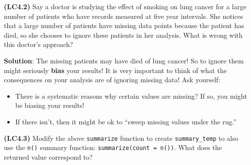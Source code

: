 \documentclass[12pt, krantz2,]{krantz}
\makeatletter
\newenvironment{Shaded}{\begin{snugshade}}{\end{snugshade}}
\newcommand{\CommentTok}[1]{\textcolor[rgb]{0.37,0.37,0.37}{\textit{#1}}}
\newcommand{\KeywordTok}[1]{\textcolor[rgb]{0.27,0.27,0.27}{\textbf{#1}}}
\newcommand{\NormalTok}[1]{#1}
\newcommand{\OperatorTok}[1]{\textcolor[rgb]{0.43,0.43,0.43}{\textbf{#1}}}
\newcommand{\StringTok}[1]{\textcolor[rgb]{0.5,0.5,0.5}{#1}}
\providecommand{\tightlist}{%
  \setlength{\itemsep}{0pt}\setlength{\parskip}{0pt}}
\newenvironment{kframe}{%
\medskip{}
\setlength{\fboxsep}{.8em}
 \def\at@end@of@kframe{}%
 \ifinner\ifhmode%
  \def\at@end@of@kframe{\end{minipage}}%
  \begin{minipage}{\columnwidth}%
 \fi\fi%
 \def\FrameCommand##1{\hskip\@totalleftmargin \hskip-\fboxsep
 \colorbox{shadecolor}{##1}\hskip-\fboxsep
     \hskip-\linewidth \hskip-\@totalleftmargin \hskip\columnwidth}%
 \MakeFramed {\advance\hsize-\width
   \@totalleftmargin\z@ \linewidth\hsize
   \@setminipage}}%
 {\par\unskip\endMakeFramed%
 \at@end@of@kframe}
\renewenvironment{Shaded}{\begin{kframe}}{\end{kframe}}
\makeatother
\begin{document}
\begin{Shaded}
\end{Shaded}

\textbf{(LC4.2)} Say a doctor is studying the effect of smoking on lung cancer for a large number of patients who have records measured at five year intervals. She notices that a large number of patients have missing data points because the patient has died, so she chooses to ignore these patients in her analysis. What is wrong with this doctor's approach?

\textbf{Solution}: The missing patients may have died of lung cancer! So to ignore them might seriously \textbf{bias} your results! It is very important to think of what the consequences on your analysis are of ignoring missing data! Ask yourself:

\begin{itemize}
\tightlist
\item
  There is a systematic reasons why certain values are missing? If so, you might be biasing your results!
\item
  If there isn't, then it might be ok to ``sweep missing values under the rug.''
\end{itemize}

\textbf{(LC4.3)} Modify the above \texttt{summarize} function to create \texttt{summary\_temp} to also use the \texttt{n()} summary function: \texttt{summarize(count\ =\ n())}. What does the returned value correspond to?
\end{document}
